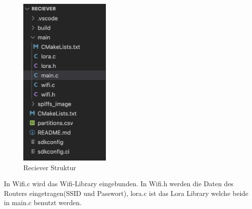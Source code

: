 \begin{figure}[h]
  \centering
  \includegraphics[width=0.4\textwidth]{./pics/Reciever Struktur.png}
  \caption{Reciever Struktur}
  \label{fig:Reciever Datei-Struktur}
\end{figure}
In Wifi.c wird das Wifi-Library eingebunden. In Wifi.h werden die Daten des Routers eingetragen(SSID und Passwort), lora.c ist das Lora Library welche beide in main.c benutzt werden.

\newpage

